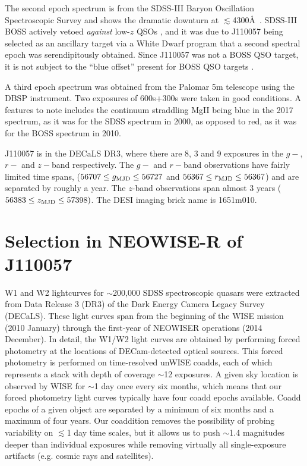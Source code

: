 \documentclass[11pt,a4paper]{article}
\begin{document}
The second epoch spectrum is from the SDSS-III Baryon Oscillation
Spectroscopic Survey \citep[BOSS; ][]{Dawson2013} and shows the dramatic
downturn at $\lesssim$4300\AA\ .  SDSS-III BOSS actively vetoed {\it
against} low-$z$ QSOs \citep{Ross2012}, and it was due to J110057 being
selected as an ancillary target via a White Dwarf program
\citep{Kepler2015, Kepler2016} that a second spectral epoch was serendipitously
obtained.  Since J110057 was not a BOSS QSO target, it is not subject
to the ``blue offset'' present for BOSS QSO targets \citep{Margala2016}.

A third epoch spectrum was obtained from the Palomar 5m telescope
using the DBSP instrument.  Two exposures of 600s+300s were taken in
good conditions.  A features to note includes the continuum straddling
MgII being blue in the 2017 spectrum, as it was for the SDSS spectrum
in 2000, as opposed to red, as it was for the BOSS spectrum in 2010.

J110057 is in the DECaLS DR3, where there are 8, 3 and 9 exposures in
the $g-$, $r-$ and $z-$band respectively. The $g-$ and $r-$band
observations have fairly limited time spans, ($56707 \leq g_{\rm MJD}
\leq 56727$ and $56367 \leq r_{\rm MJD} \leq 56367$) and are separated
by roughly a year. The $z$-band observations span almost 3 years
($56383 \leq z_{\rm MJD} \leq 57398)$.  The DESI imaging brick name is
1651m010.


\section*{Selection in NEOWISE-R of J110057}

W1 and W2 lightcurves for $\sim$200,000 SDSS spectroscopic quasars
were extracted from Data Release 3 (DR3) of the Dark Energy Camera
Legacy Survey (DECaLS). These light curves span from the beginning of
the WISE mission (2010 January) through the first-year of NEOWISER
operations (2014 December). In detail, the W1/W2 light curves are
obtained by performing forced photometry at the locations of
DECam-detected optical sources. This forced photometry is performed on
time-resolved unWISE coadds, each of which represents a stack with
depth of coverage $\sim$12 exposures. A given sky location is observed
by WISE for $\sim$1 day once every six months, which means that our
forced photometry light curves typically have four coadd epochs
available. Coadd epochs of a given object are separated by a minimum
of six months and a maximum of four years. Our coaddition removes the
possibility of probing variability on $\lesssim$1 day time scales, but
it allows us to push $\sim$1.4 magnitudes deeper than individual
exposures while removing virtually all single-exposure artifacts
(e.g. cosmic rays and satellites).
\end{document}
